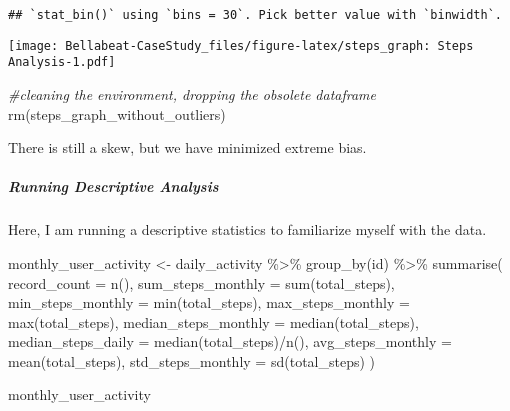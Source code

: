 \documentclass[
]{article}
\newenvironment{Shaded}{\begin{snugshade}}{\end{snugshade}}
\newcommand{\AttributeTok}[1]{\textcolor[rgb]{0.77,0.63,0.00}{#1}}
\newcommand{\CommentTok}[1]{\textcolor[rgb]{0.56,0.35,0.01}{\textit{#1}}}
\newcommand{\FunctionTok}[1]{\textcolor[rgb]{0.00,0.00,0.00}{#1}}
\newcommand{\NormalTok}[1]{#1}
\newcommand{\OtherTok}[1]{\textcolor[rgb]{0.56,0.35,0.01}{#1}}
\newcommand{\SpecialCharTok}[1]{\textcolor[rgb]{0.00,0.00,0.00}{#1}}
\begin{document}
\begin{verbatim}
## `stat_bin()` using `bins = 30`. Pick better value with `binwidth`.
\end{verbatim}

\texttt{[image: Bellabeat-CaseStudy\_files/figure-latex/steps\_graph: Steps Analysis-1.pdf]}

\begin{Shaded}
\begin{Highlighting}[]
\CommentTok{\#cleaning the environment, dropping the obsolete dataframe}
\FunctionTok{rm}\NormalTok{(steps\_graph\_without\_outliers)}
\end{Highlighting}
\end{Shaded}

There is still a skew, but we have minimized extreme bias.

\hypertarget{running-descriptive-analysis}{%
\subparagraph{\texorpdfstring{\textbf{Running Descriptive
Analysis}}{Running Descriptive Analysis}}\label{running-descriptive-analysis}}

Here, I am running a descriptive statistics to familiarize myself with
the data.

\begin{Shaded}
\begin{Highlighting}[]
\NormalTok{monthly\_user\_activity }\OtherTok{\textless{}{-}}
\NormalTok{      daily\_activity  }\SpecialCharTok{\%\textgreater{}\%} 
      \FunctionTok{group\_by}\NormalTok{(id) }\SpecialCharTok{\%\textgreater{}\%} 
      \FunctionTok{summarise}\NormalTok{(}
        \AttributeTok{record\_count =} \FunctionTok{n}\NormalTok{(),}
        \AttributeTok{sum\_steps\_monthly =} \FunctionTok{sum}\NormalTok{(total\_steps),}
        \AttributeTok{min\_steps\_monthly =} \FunctionTok{min}\NormalTok{(total\_steps),}
        \AttributeTok{max\_steps\_monthly =} \FunctionTok{max}\NormalTok{(total\_steps),}
        \AttributeTok{median\_steps\_monthly =} \FunctionTok{median}\NormalTok{(total\_steps),}
        \AttributeTok{median\_steps\_daily =} \FunctionTok{median}\NormalTok{(total\_steps)}\SpecialCharTok{/}\FunctionTok{n}\NormalTok{(),}
        \AttributeTok{avg\_steps\_monthly =} \FunctionTok{mean}\NormalTok{(total\_steps),}
        \AttributeTok{std\_steps\_monthly =} \FunctionTok{sd}\NormalTok{(total\_steps)}
\NormalTok{      )}

\NormalTok{monthly\_user\_activity}
\end{Highlighting}
\end{Shaded}
\end{document}
